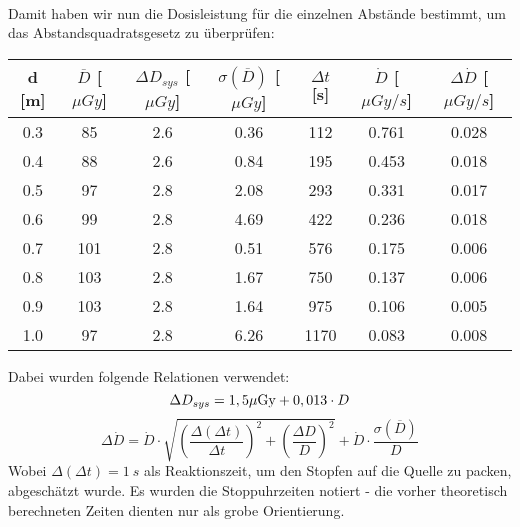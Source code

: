 \begin{center}
\begin{tabular}{c|c|c|c|c}
		\end{tabular}
        \label{dft:osl}
	\end{center}
\minipend
\vspace{5mm}
\newpage
\ \\
Damit haben wir nun die Dosisleistung für die einzelnen Abstände bestimmt, um das Abstandsquadratsgesetz zu überprüfen:
\begin{center}	
	\minipanf
		\begin{tabular}{c|c|c|c|c|c|c}
					d [m] & $\overline{D}$ [$\mu Gy$] & $\Delta D_{sys}$ [$\mu Gy$] & $\sigma(\overline{D})$ [$\mu Gy$] & $\Delta t$ [s] & $\dot{D}$ [$\mu Gy / s$] & $\Delta\dot{D}$ [$\mu Gy / s$] \\
		\hline	0.3 & 85 & 2.6 & 0.36 & 112 & 0.761 & 0.028 \\
				0.4	& 88 & 2.6 & 0.84 & 195 & 0.453 & 0.018 \\
				0.5 & 97 & 2.8 & 2.08 & 293 & 0.331 & 0.017 \\
			    0.6	& 99 & 2.8 & 4.69 & 422 & 0.236 & 0.018 \\
			    0.7 & 101 & 2.8 & 0.51 & 576 & 0.175 & 0.006 \\
			    0.8	& 103 & 2.8 & 1.67 & 750 & 0.137 & 0.006 \\
				0.9 & 103 & 2.8 & 1.64 & 975 & 0.106 & 0.005 \\
				1.0 & 97 & 2.8 & 6.26 & 1170 & 0.083 & 0.008				
		\end{tabular}
		\label{dft:Abstandsquadrat}
	\minipend
	\vspace{3mm}
\end{center}

Dabei wurden folgende Relationen verwendet:
\begin{equation*}
	\Delta D_{sys} = 1,5 \unit{\mu Gy} + 0,013 \cdot D \\
\end{equation*}
\begin{equation*}
	\Delta \dot{D} = \dot{D} \cdot \sqrt{\left(\frac{\Delta (\Delta t)}			{\Delta t}\right)^2 + \left(\frac{\Delta D}{D} \right)^2} + \dot{D} 			\cdot \frac{\sigma(\overline{D})}{D}
\end{equation*}
Wobei $\Delta(\Delta t) = 1\ \unit{s}$ als Reaktionszeit, um den Stopfen auf die Quelle zu packen, abgeschätzt wurde. Es wurden die Stoppuhrzeiten notiert - die vorher theoretisch berechneten Zeiten dienten nur als grobe Orientierung.


